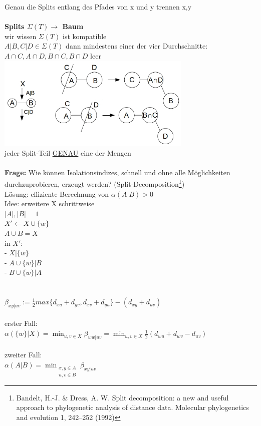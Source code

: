 Genau die Splits entlang des Pfades von x und y trennen x,y
\\\\
\textbf{Splits $\Sigma(T) \rightarrow$ Baum}\\
wir wissen $\Sigma(T)$ ist kompatible\\
$A|B,C|D \in \Sigma(T)$ dann mindestens einer der vier Durchschnitte:\\ $A \cap C, A \cap D, B \cap C, B \cap D$ leer\\
\includegraphics[width=0.7\textwidth]{lectures/161216/pix/3.jpg}\\
jeder Split-Teil \underline{GENAU} eine der Mengen\\\\
\textbf{Frage:} Wie können Isolationsindizes, schnell und ohne alle Möglichkeiten durchzuprobieren, erzeugt werden? (Split-Decomposition\footnote{Bandelt, H.-J. \& Dress, A. W. Split decomposition: a new and useful approach to phylogenetic analysis of distance data. Molecular phylogenetics and evolution 1, 242–252 (1992)})\\
Lösung: effiziente Berechnung von $\alpha(A|B)>0$\\
Idee: erweitere X schrittweise\\
$|A|,|B|=1$\\
$X' \leftarrow X \cup \{w\}$\\
$A\cup B=X$\\
in $X':$\\
- \hspace{10pt}$X|\{w\}$\\
- \hspace{10pt}$A\cup \{w\}|B$\\
- \hspace{10pt}$B\cup \{w\}|A$\\
\\\\
$\beta_{xy|uv}:=\frac{1}{2}max\{d_{xu} + d_{yv}, d_{xv} + d_{yu}\} - (d_{xy} + d_{uv})$\\\\
erster Fall:\\
$\alpha(\{w\}|X)=\displaystyle\min_{u,v \in X}\beta_{ww|uv}=\displaystyle\min_{u,v \in X} \frac{1}{2}(d_{wu} + d_{wv} - d_{uv})$\\\\
zweiter Fall:\\
$\alpha(A|B)=\displaystyle\min_{\substack{x,y \in A \\ u,v \in B}}\beta_{xy|uv}$\\

